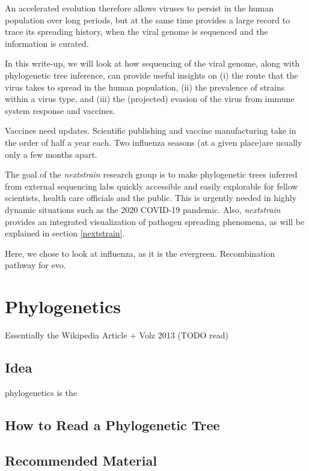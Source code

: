 \documentclass[12pt]{scrartcl}
\newcommand{\red}[1]{{\color{red}#1}}
\begin{document}
    An accelerated evolution therefore allows viruses to persist in the human population over long periods, but at the same time provides a large record to trace its spreading history, when the viral genome is sequenced and the information is curated.

    In this write-up, we will look at how sequencing of the viral genome, along with phylogenetic tree inference, can provide useful insights on (i) the route that the virus takes to spread in the human population, (ii) the prevalence of strains within a virus type, and (iii) the (projected) evasion of the virus from immune system response and vaccines.

    \red{Vaccines need updates. Scientific publishing and vaccine manufacturing take in the order of half a year each. Two influenza seasons (at a given place)are usually only a few months apart.}

    The goal of the \textit{nextstrain} research group is to make phylogenetic trees inferred from external sequencing labs quickly accessible and easily explorable for fellow scientists, health care officials and the public. This is urgently needed in highly dynamic situations such as the 2020 COVID-19 pandemic. Also, \textit{nextstrain} provides an integrated visualization of pathogen spreading phenomena, as will be explained in section \ref{nextstrain}.

    Here, we chose to look at influenza, as it is the evergreen. \red{Recombination pathway for evo.}

\section{Phylogenetics}

  Essentially the Wikipedia Article + Volz 2013 (TODO read)

  \subsection{Idea}

  \Gls{phylogenetics} is the

  \subsection{How to Read a Phylogenetic Tree}

  \subsection{Recommended Material}
\end{document}
